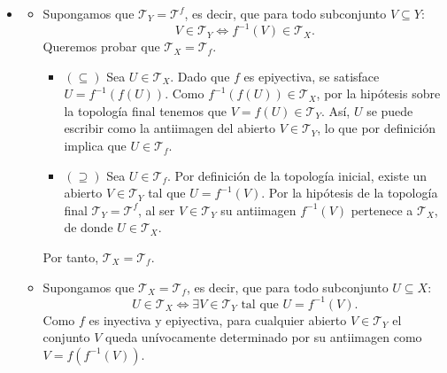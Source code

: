 \begin{sol}
\begin{itemize}
\begin{itemize}
            \item [$(\Leftarrow)$] Supongamos que $\mathcal{T}_X = \mathcal{T}_f$. Por ser $\mathcal{T}_X$ la topología inicial, $f$ es continua. Para verificar que $f$ es abierta (lo que implica que $f^{-1}$ es continua), tomemos un abierto $U \in \mathcal{T}_X = \mathcal{T}_f$. Por definición de $\mathcal{T}_f$, existe un abierto $V \in \mathcal{T}_Y$ tal que $U = f^{-1}(V)$. Aplicando la imagen directa y usando la epiyectividad de $f$
            \[
                f(U) = f(f^{-1}(V)) = V \in \mathcal{T}_Y.
            \]
            Así, $f(U)$ es abierto en $Y$, luego $f$ es abierta. Al ser biyectiva, continua y abierta, $f$ es un homeomorfismo.
        \end{itemize}    
        \item [$b) \iff c)$] 
            \begin{itemize} 
            \item [$(\Rightarrow)$] Supongamos que $\mathcal{T}_Y = \mathcal{T}^f$, es decir, que para todo subconjunto $V \subseteq Y$:
        \[
            V \in \mathcal{T}_Y \iff f^{-1}(V) \in \mathcal{T}_X.
        \]
        Queremos probar que $\mathcal{T}_X = \mathcal{T}_f$.
        \begin{itemize}
            \item $(\subseteq)$ Sea $U \in \mathcal{T}_X$. Dado que $f$ es epiyectiva, se satisface $U = f^{-1}(f(U))$. Como $f^{-1}(f(U)) \in \mathcal{T}_X$, por la hipótesis sobre la topología final tenemos que $V = f(U) \in \mathcal{T}_Y$. Así, $U$ se puede escribir como la antiimagen del abierto $V \in \mathcal{T}_Y$, lo que por definición implica que $U \in \mathcal{T}_f$.
            \item $(\supseteq)$ Sea $U \in \mathcal{T}_f$. Por definición de la topología inicial, existe un abierto $V \in \mathcal{T}_Y$ tal que $U = f^{-1}(V)$. Por la hipótesis de la topología final $\mathcal{T}_Y = \mathcal{T}^f$, al ser $V \in \mathcal{T}_Y$ su antiimagen $f^{-1}(V)$ pertenece a $\mathcal{T}_X$, de donde $U \in \mathcal{T}_X$.
        \end{itemize}
        Por tanto, $\mathcal{T}_X = \mathcal{T}_f$.

        \item [$(\Leftarrow)$] Supongamos que $\mathcal{T}_X = \mathcal{T}_f$, es decir, que para todo subconjunto $U \subseteq X$:
        \[
            U \in \mathcal{T}_X \iff \exists V \in \mathcal{T}_Y \text{ tal que } U = f^{-1}(V).
        \]
        Como $f$ es inyectiva y epiyectiva, para cualquier abierto $V \in \mathcal{T}_Y$ el conjunto $V$ queda unívocamente determinado por su antiimagen como $V = f(f^{-1}(V))$.
        

\end{itemize}
\end{itemize}
\end{sol}
